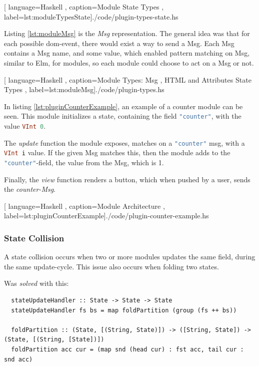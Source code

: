 \begin{center}
  
    [ language=Haskell
    , caption={Module State Types}
    , label=lst:moduleTypesState]{./code/plugin-types-state.hs}
\end{center}

Listing \ref{lst:moduleMsg} is the \textit{Msg} representation. The general idea
was that for each possible \gls{dom}-event, there would exist a way to send a
Msg. Each Msg contains a Msg name, and some value, which enabled pattern
matching on Msg, similar to Elm, for modules, so each module could choose to act
on a Msg or not.

\begin{center}
  \centering
  
    [ language=Haskell
    , caption={Module Types: Msg
    , HTML and Attributes State Types}
    , label=lst:moduleMsg]{./code/plugin-types.hs}
\end{center}

In listing \ref{lst:pluginCounterExample}, an example of a counter module can be
seen. This module initializes a state, containing the field
\lstinline[language=Haskell]{"counter"}, with the value
\lstinline[language=Haskell]{VInt 0}.

The \textit{update} function the module exposes, matches on a
\lstinline[language=Haskell]{"counter"} msg, with a
\lstinline[language=Haskell]{VInt i} value. If the given Msg matches this, then
the module adds to the \lstinline[language=Haskell]{"counter"}-field, the value
from the Msg, which is 1.

Finally, the \textit{view} function renders a button, which when pushed by a
user, sends the \textit{counter-Msg}.

\begin{center}
  
    [ language=Haskell
    , caption={Module Architecture}
    , label=lst:pluginCounterExample]{./code/plugin-counter-example.hs}
\end{center}

\subsubsection{State Collision}

A state collision occurs when two or more modules updates the same field, during
the same update-cycle. This issue also occurs when folding two states.

Was \textit{solved} with this:

\begin{verbatim}
  stateUpdateHandler :: State -> State -> State
  stateUpdateHandler fs bs = map foldPartition (group (fs ++ bs))

  foldPartition :: (State, [(String, State)]) -> ([String, State]) -> (State, [(String, [State])])
  foldPartition acc cur = (map snd (head cur) : fst acc, tail cur : snd acc)
\end{verbatim}

